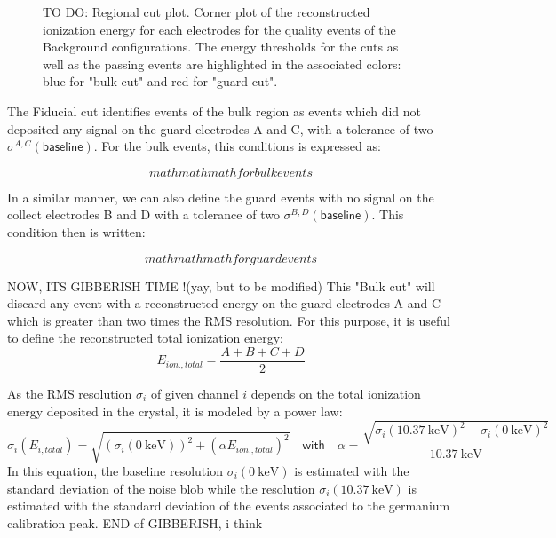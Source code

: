 \begin{figure}
\centering
\caption{TO DO: Regional cut plot. Corner plot of the reconstructed ionization energy for each electrodes for the quality events of the Background configurations. The energy thresholds for the cuts as well as the passing events are highlighted in the associated colors: blue for "bulk cut" and red for "guard cut".}
\label{fig:fiducial-cut}
\end{figure}

The Fiducial cut identifies events of the bulk region as events which did not deposited any signal on the guard electrodes A and C, with a tolerance of two $\sigma^{A,C}\left( \textsf{baseline} \right)$. For the bulk events, this conditions is expressed as:

\begin{equation}
mathmathmath for bulk events
\end{equation}

In a similar manner, we can also define the guard events with no signal on the collect electrodes B and D with a tolerance of two $\sigma^{B,D}\left( \textsf{baseline} \right)$. This condition then is written:

\begin{equation}
mathmathmath for guard events
\end{equation}

{\color{red}NOW, ITS GIBBERISH TIME !(yay, but to be modified)}
This "Bulk cut" will discard any event with a reconstructed energy on the guard electrodes A and C which is greater than two times the RMS resolution.
For this purpose, it is useful to define the reconstructed total ionization energy:
\begin{equation}
E_{ion., total} = \frac{A+B+C+D}{2}
\end{equation}


As the RMS resolution $\sigma_i$ of given channel $i$ depends on the total ionization energy deposited in the crystal, it is modeled by a power law:
\begin{equation}
\sigma_i\left( E_{i, total} \right)
=
\sqrt{ 
\left( \sigma_i(\SI{0}{\kilo\eV}) \right)^2 + 
\left( \alpha E_{ion., total} \right)^2
}
\quad \textsf{with} \quad
\alpha = \frac{\sqrt{\sigma_i(\SI{10.37}{\kilo\eV})^2 - \sigma_i(\SI{0}{\kilo\eV})^2}}{\SI{10.37}{\kilo\eV}}
\end{equation}
In this equation, the baseline resolution $\sigma_i(\SI{0}{\kilo\eV})$ is estimated with the standard deviation of the noise blob while the resolution $\sigma_i(\SI{10.37}{\kilo\eV})$ is estimated with the standard deviation of the events associated to the germanium calibration peak.
{\color{red}END of GIBBERISH, i think}


